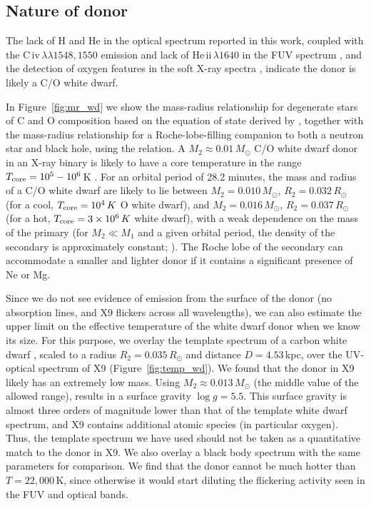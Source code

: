 \documentclass[a4paper,fleqn,usenatbib]{mnras}
\begin{document}
\subsection{Nature of donor}
\label{sec:donor}

The lack of H and He in the optical spectrum reported in this work, coupled with the C\,{\sc iv}\,$\lambda\lambda1548,1550$ emission and lack of He\,{\sc ii}\,$\lambda 1640$ in the FUV spectrum \citep{2008ApJ...683.1006K}, and the detection of oxygen features in the soft X-ray spectra \citep{2017MNRAS.467.2199B}, indicate the donor is likely a C/O white dwarf.

In Figure~\ref{fig:mr_wd} we show the mass-radius relationship for degenerate stars of C and O composition based on the equation of state derived by \citet{2003ApJ...598.1217D}, together with the mass-radius relationship for a Roche-lobe-filling companion to both a neutron star and black hole, using the \citet{1983ApJ...268..368E} relation. A $M_2 \approx 0.01\,M_\odot$ C/O white dwarf donor in an X-ray binary is likely to have a core temperature in the range $T_{\rm core} = 10^5 - 10^6$\,K \citep{2002ApJ...577L..27B, 2003ApJ...598..431N}. For an orbital period of 28.2 minutes, the mass and radius of a C/O white dwarf are likely to lie between $M_2 = 0.010\,M_\odot$, $R_2 = 0.032\,R_\odot$ (for a cool, $T_{\rm core} = 10^4\,K$ O white dwarf), and $M_2 = 0.016 \,M_\odot$, $R_2 = 0.037\,R_\odot$ (for a hot, $T_{\rm core} = 3 \times 10^6\,K$ white dwarf), with a weak dependence on the mass of the primary (for $M_2 \ll M_1$ and a given orbital period, the density of the secondary is approximately constant; \citealp{1983ApJ...268..368E}). The Roche lobe of the secondary can accommodate a smaller and lighter donor if it contains a significant presence of Ne or Mg.

Since we do not see evidence of emission from the surface of the donor (no absorption lines, and X9 flickers across all wavelengths), we can also estimate the upper limit on the effective temperature of the white dwarf donor when we know its size. For this purpose, we overlay the template spectrum of a carbon white dwarf \citep[$\log g = 8$, $T = 22,000$\,K;][]{2008ApJ...683..978D}, scaled to a radius $R_2 = 0.035\,R_\odot$ and distance $D = 4.53$\,kpc, over the UV-optical spectrum of X9 (Figure~\ref{fig:temp_wd}). We found that the donor in X9 likely has an extremely low mass. Using $M_2 \approx 0.013\,M_\odot$ (the middle value of the allowed range), results in a surface gravity $\log g = 5.5$. This surface gravity is almost three orders of magnitude lower than that of the template white dwarf spectrum, and X9 contains additional atomic species (in particular oxygen). Thus, the template spectrum we have used should not be taken as a quantitative match to the donor in X9. We also overlay a black body spectrum with the same parameters for comparison. We find that the donor cannot be much hotter than $T = 22,000$\,K, since otherwise it would start diluting the flickering activity seen in the FUV and optical bands.
\end{document}
